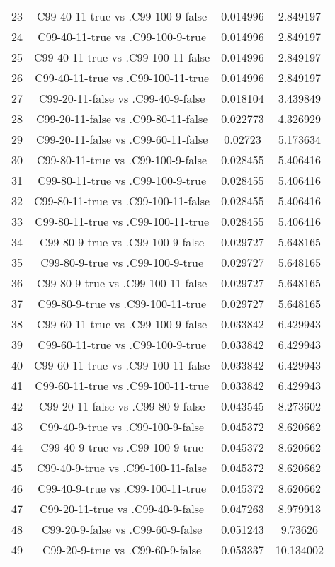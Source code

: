 \documentclass[a4paper,10pt]{article}
\begin{document}
\begin{landscape}
\begin{table}[!htp]
\begin{tabular}{cccc}
23&C99-40-11-true vs .C99-100-9-false&0.014996&2.849197\\
24&C99-40-11-true vs .C99-100-9-true&0.014996&2.849197\\
25&C99-40-11-true vs .C99-100-11-false&0.014996&2.849197\\
26&C99-40-11-true vs .C99-100-11-true&0.014996&2.849197\\
27&C99-20-11-false vs .C99-40-9-false&0.018104&3.439849\\
28&C99-20-11-false vs .C99-80-11-false&0.022773&4.326929\\
29&C99-20-11-false vs .C99-60-11-false&0.02723&5.173634\\
30&C99-80-11-true vs .C99-100-9-false&0.028455&5.406416\\
31&C99-80-11-true vs .C99-100-9-true&0.028455&5.406416\\
32&C99-80-11-true vs .C99-100-11-false&0.028455&5.406416\\
33&C99-80-11-true vs .C99-100-11-true&0.028455&5.406416\\
34&C99-80-9-true vs .C99-100-9-false&0.029727&5.648165\\
35&C99-80-9-true vs .C99-100-9-true&0.029727&5.648165\\
36&C99-80-9-true vs .C99-100-11-false&0.029727&5.648165\\
37&C99-80-9-true vs .C99-100-11-true&0.029727&5.648165\\
38&C99-60-11-true vs .C99-100-9-false&0.033842&6.429943\\
39&C99-60-11-true vs .C99-100-9-true&0.033842&6.429943\\
40&C99-60-11-true vs .C99-100-11-false&0.033842&6.429943\\
41&C99-60-11-true vs .C99-100-11-true&0.033842&6.429943\\
42&C99-20-11-false vs .C99-80-9-false&0.043545&8.273602\\
43&C99-40-9-true vs .C99-100-9-false&0.045372&8.620662\\
44&C99-40-9-true vs .C99-100-9-true&0.045372&8.620662\\
45&C99-40-9-true vs .C99-100-11-false&0.045372&8.620662\\
46&C99-40-9-true vs .C99-100-11-true&0.045372&8.620662\\
47&C99-20-11-true vs .C99-40-9-false&0.047263&8.979913\\
48&C99-20-9-false vs .C99-60-9-false&0.051243&9.73626\\
49&C99-20-9-true vs .C99-60-9-false&0.053337&10.134002\\

\end{tabular}
\end{table}
\end{landscape}
\end{document}
